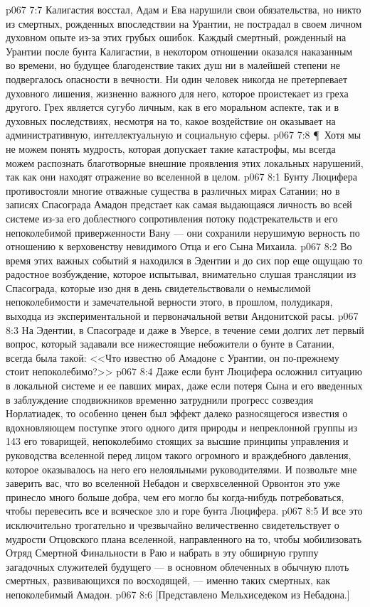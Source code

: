 \vs p067 7:7 Калигастия восстал, Адам и Ева нарушили свои обязательства, но никто из смертных, рожденных впоследствии на Урантии, не пострадал в своем личном духовном опыте из\hyp{}за этих грубых ошибок. Каждый смертный, рожденный на Урантии после бунта Калигастии, в некотором отношении оказался наказанным во времени, но будущее благоденствие таких душ ни в малейшей степени не подвергалось опасности в вечности. Ни один человек никогда не претерпевает духовного лишения, жизненно важного для него, которое проистекает из греха другого. Грех является сугубо личным, как в его моральном аспекте, так и в духовных последствиях, несмотря на то, какое воздействие он оказывает на административную, интеллектуальную и социальную сферы.
\vs p067 7:8 \P\ Хотя мы не можем понять мудрость, которая допускает такие катастрофы, мы всегда можем распознать благотворные внешние проявления этих локальных нарушений, так как они находят отражение во вселенной в целом.
\vs p067 8:1 Бунту Люцифера противостояли многие отважные существа в различных мирах Сатании; но в записях Спасограда Амадон предстает как самая выдающаяся личность во всей системе из\hyp{}за его доблестного сопротивления потоку подстрекательств и его непоколебимой приверженности Вану --- они сохранили нерушимую верность по отношению к верховенству невидимого Отца и его Сына Михаила.
\vs p067 8:2 Во время этих важных событий я находился в Эдентии и до сих пор еще ощущаю то радостное возбуждение, которое испытывал, внимательно слушая трансляции из Спасограда, которые изо дня в день свидетельствовали о немыслимой непоколебимости и замечательной верности этого, в прошлом, полудикаря, выходца из экспериментальной и первоначальной ветви Андонитской расы.
\vs p067 8:3 На Эдентии, в Спасограде и даже в Уверсе, в течение семи долгих лет первый вопрос, который задавали все нижестоящие небожители о бунте в Сатании, всегда была такой: <<Что известно об Амадоне с Урантии, он по\hyp{}прежнему стоит непоколебимо?>>
\vs p067 8:4 Даже если бунт Люцифера осложнил ситуацию в локальной системе и ее павших мирах, даже если потеря Сына и его введенных в заблуждение сподвижников временно затруднили прогресс созвездия Норлатиадек, то особенно ценен был эффект далеко разносящегося известия о вдохновляющем поступке этого одного дитя природы и непреклонной группы из 143 его товарищей, непоколебимо стоящих за высшие принципы управления и руководства вселенной перед лицом такого огромного и враждебного давления, которое оказывалось на него его нелояльными руководителями. И позвольте мне заверить вас, что во вселенной Небадон и сверхвселенной Орвонтон это уже принесло много больше добра, чем его могло бы когда\hyp{}нибудь потребоваться, чтобы перевесить все и всяческое зло и горе бунта Люцифера.
\vs p067 8:5 И все это исключительно трогательно и чрезвычайно величественно свидетельствует о мудрости Отцовского плана вселенной, направленного на то, чтобы мобилизовать Отряд Смертной Финальности в Раю и набрать в эту обширную группу загадочных служителей будущего --- в основном облеченных в обычную плоть смертных, развивающихся по восходящей, --- именно таких смертных, как непоколебимый Амадон.
\vs p067 8:6 [Представлено Мельхиседеком из Небадона.]
